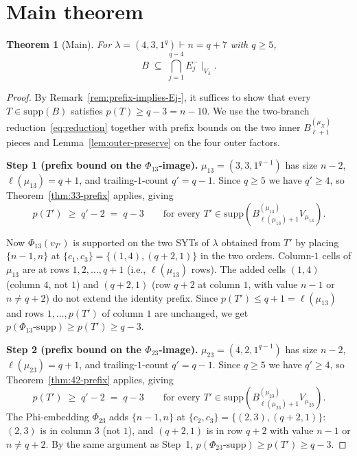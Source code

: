 \documentclass[11pt]{article}
\newtheorem{theorem}{Theorem}
\theoremstyle{definition}
\newcommand{\supp}{\mathrm{supp}}
\begin{document}
\section{Main theorem}\label{sec:main}

\begin{theorem}[Main]\label{thm:main}
For $\lambda = (4, 3, 1^q) \vdash n = q + 7$ with $q \ge 5$,
\[
   B \;\subseteq\; \bigcap_{j=1}^{q-4} E_j^-\!\mid_{V_\lambda}.
\]
\end{theorem}

\begin{proof}
By Remark~\ref{rem:prefix-implies-Ej-}, it suffices to show that every
$T \in \supp(B)$ satisfies $p(T) \ge q - 3 = n - 10$.  We use the
two-branch reduction~\eqref{eq:reduction} together with prefix bounds
on the two inner $B^{(\mu_X)}_{\ell+1}$ pieces and
Lemma~\ref{lem:outer-preserve} on the four outer factors.

\medskip\textbf{Step 1 (prefix bound on the $\Phi_{13}$-image).}
$\mu_{13} = (3, 3, 1^{q-1})$ has size $n - 2$, $\ell(\mu_{13}) = q+1$,
and trailing-$1$-count $q' = q - 1$.  Since $q \ge 5$ we have
$q' \ge 4$, so Theorem~\ref{thm:33-prefix} applies, giving
\[
   p(T') \;\ge\; q' - 2 \;=\; q - 3
   \qquad \text{for every } T' \in \supp(B^{(\mu_{13})}_{\ell(\mu_{13})+1} V_{\mu_{13}}).
\]

Now $\Phi_{13}(v_{T'})$ is supported on the two SYTs of $\lambda$
obtained from $T'$ by placing $\{n-1, n\}$ at $\{c_1, c_3\} =
\{(1, 4), (q+2, 1)\}$ in the two orders.  Column-$1$ cells of
$\mu_{13}$ are at rows $1, 2, \ldots, q+1$ (i.e., $\ell(\mu_{13})$
rows).  The added cells $(1, 4)$ (column $4$, not $1$) and $(q+2, 1)$
(row $q+2$ at column $1$, with value $n - 1$ or $n \ne q + 2$) do not
extend the identity prefix.  Since $p(T') \le q + 1 = \ell(\mu_{13})$
and rows $1, \ldots, p(T')$ of column $1$ are unchanged, we get
$p(\Phi_{13}\text{-supp}) \ge p(T') \ge q - 3$.

\medskip\textbf{Step 2 (prefix bound on the $\Phi_{23}$-image).}
$\mu_{23} = (4, 2, 1^{q-1})$ has size $n - 2$, $\ell(\mu_{23}) = q+1$,
and trailing-$1$-count $q' = q - 1$.  Since $q \ge 5$ we have
$q' \ge 4$, so Theorem~\ref{thm:42-prefix} applies, giving
\[
   p(T') \;\ge\; q' - 2 \;=\; q - 3
   \qquad \text{for every } T' \in \supp(B^{(\mu_{23})}_{\ell(\mu_{23})+1} V_{\mu_{23}}).
\]
The Phi-embedding $\Phi_{23}$ adds $\{n-1, n\}$ at $\{c_2, c_3\} =
\{(2, 3), (q+2, 1)\}$: $(2, 3)$ is in column $3$ (not $1$), and
$(q+2, 1)$ is in row $q+2$ with value $n-1$ or $n \ne q+2$.  By the
same argument as Step~1, $p(\Phi_{23}\text{-supp}) \ge p(T') \ge q - 3$.


\end{proof}
\end{document}
